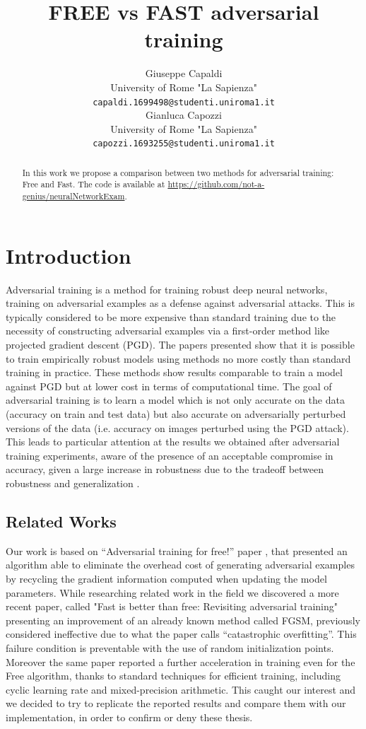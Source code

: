 \documentclass{article}
\title{FREE vs FAST adversarial training}
\author{
	Giuseppe Capaldi\\
	University of Rome "La Sapienza"\\
	\texttt{capaldi.1699498@studenti.uniroma1.it}\\
	\And
	Gianluca Capozzi\\
	University of Rome "La Sapienza"\\
	\texttt{capozzi.1693255@studenti.uniroma1.it}\\
}
\begin{document}
\maketitle

\begin{abstract}
In this work we propose a comparison between two methods for adversarial training: Free and Fast. The code is available at \url{https://github.com/not-a-genius/neuralNetworkExam}.
\end{abstract}

\section{Introduction}
Adversarial training is a method for training robust deep neural networks, training on adversarial examples as a defense against adversarial attacks. This is typically considered to be more expensive than standard training due to the necessity of constructing adversarial examples via a first-order method like projected gradient descent (PGD). The papers presented show that it is possible to train empirically robust models using methods no more costly than standard training in practice.
These methods show results comparable to train a model against PGD but at lower cost in terms of computational time.
The goal of adversarial training is to learn a model which is not only accurate on the data (accuracy on train and test data) but also accurate on adversarially perturbed versions of the data (i.e. accuracy on images perturbed using the PGD attack).  
This leads to particular attention at the results we obtained after adversarial training experiments, aware of the presence of an acceptable compromise in accuracy, given a large increase in robustness due to the tradeoff between robustness and generalization \cite{TsiprasEtAl, ZhangEtAl2019a, ShafahiEtAl2019a}.

\subsection{Related Works}
Our work is based on “Adversarial training for free!” paper \cite{ShafahiEtAl2019b}, that presented an algorithm able to eliminate the overhead cost of generating adversarial examples by recycling the gradient information computed when updating the model parameters. While researching related work in the field we discovered a more recent paper, called "Fast is better than free: Revisiting adversarial training" \cite{WongEtAl2020} presenting an improvement of an already known method called FGSM, previously considered ineffective due to what the paper calls “catastrophic overfitting”. This failure condition is preventable with the use of random initialization points. Moreover the same paper reported a further acceleration in training even for the Free algorithm, thanks to standard techniques for efficient training, including cyclic learning rate and mixed-precision arithmetic. This caught our interest and we decided to try to replicate the reported results and compare them with our implementation, in order to confirm or deny these thesis.
\end{document}
